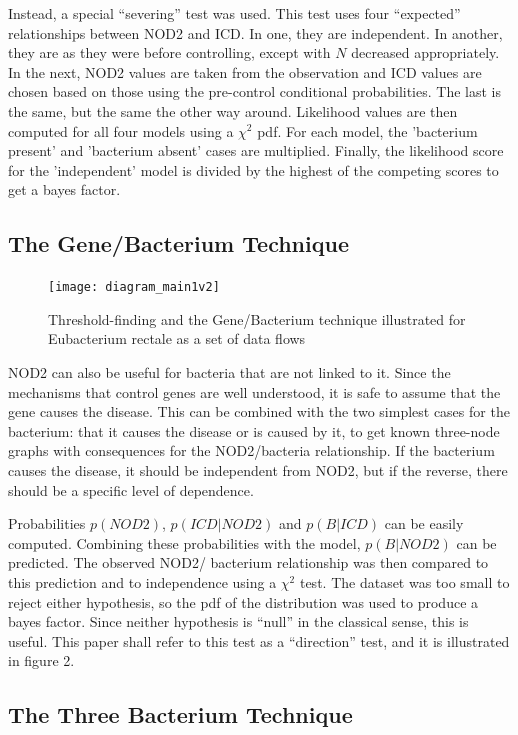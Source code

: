 \documentclass[a4paper]{article}
\begin{document}
Instead, a special ``severing'' test was used.  This test uses four
``expected'' relationships between NOD2 and ICD.  In one, they are
independent.  In another, they are as they were before controlling,
except with $N$ decreased appropriately.  In the next, NOD2 values are
taken from the observation and ICD values are chosen based on those
using the pre-control conditional probabilities.  The last is the
same, but
the same the other way around.  Likelihood values are then computed for
all four models using a $\chi^2$ pdf.  For each model,  the
'bacterium present' and 'bacterium absent' cases are multiplied.  Finally, the
likelihood score for the 'independent' model is divided by the highest of the
competing scores to get a bayes factor.

\subsection{The Gene/Bacterium Technique}

\begin{figure}[t!]
  \texttt{[image: diagram\_main1v2]}
  \caption{Threshold-finding and the Gene/Bacterium technique
    illustrated for Eubacterium rectale as a set of data flows}
\end{figure}

NOD2 can also be useful for bacteria that are not linked to it.  Since
the mechanisms that control genes are well understood, it is safe to assume
that the gene causes the disease.  This can be combined with the two simplest
cases for the bacterium: that it causes the disease or is
caused by it, to get known three-node graphs with consequences for the
NOD2/bacteria relationship.  If the bacterium causes the disease, it
should be independent from
NOD2, but if the reverse, there should be a specific level of dependence.

Probabilities $p(NOD2)$, $p(ICD|NOD2)$ and
$p(B|ICD)$ can be easily computed.  Combining these probabilities with
the model, $p(B|NOD2)$ can be predicted.  
The observed NOD2/ bacterium relationship was then compared to this
prediction and to independence
using a $\chi^2$ test.  The dataset was too small to
reject either hypothesis, so the pdf of the distribution was used 
to produce a bayes factor.  Since neither hypothesis is ``null'' in the
classical sense, this is useful.  This paper shall refer to this test as a
``direction'' test, and it is illustrated in figure 2.

\subsection{The Three Bacterium Technique}
\end{document}

